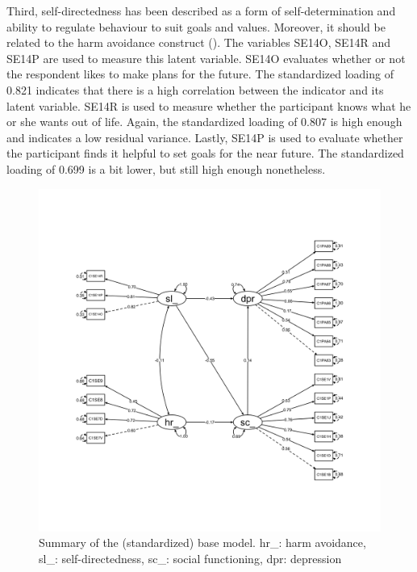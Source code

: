 \documentclass[11pt]{article}
\begin{document}
Third, self-directedness has been described as a form of self-determination and
ability to regulate behaviour to suit goals and values. Moreover, it should be
related to the harm avoidance construct (\cite{tse2011}).
The variables SE14O, SE14R and SE14P are used to measure this latent variable.
SE14O evaluates whether or not the respondent likes to make plans for the future.
The standardized loading of 0.821 indicates that there is a high correlation
between the indicator and its latent variable. SE14R is used to measure whether
the participant knows what he or she wants out of life. Again, the standardized
loading of 0.807 is high enough and indicates a low residual variance. Lastly,
SE14P is used to evaluate whether the participant finds it
helpful to set goals for the near future. The standardized loading of 0.699 is a
bit lower, but still high enough nonetheless.

\begin{figure}[h]
\centering
\includegraphics[width=14cm]{../visualizations/base_model.png}
\caption{Summary of the (standardized) base model. hr\_: harm avoidance,
         sl\_: self-directedness, sc\_: social functioning, dpr: depression}
\end{figure}

\end{document}
